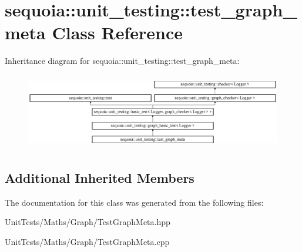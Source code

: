 \hypertarget{classsequoia_1_1unit__testing_1_1test__graph__meta}{}\section{sequoia\+::unit\+\_\+testing\+::test\+\_\+graph\+\_\+meta Class Reference}
\label{classsequoia_1_1unit__testing_1_1test__graph__meta}
Inheritance diagram for sequoia\+::unit\+\_\+testing\+::test\+\_\+graph\+\_\+meta\+:\begin{figure}[H]
\begin{center}
\leavevmode
\includegraphics[height=3.357314cm]{classsequoia_1_1unit__testing_1_1test__graph__meta}
\end{center}
\end{figure}
\subsection*{Additional Inherited Members}


The documentation for this class was generated from the following files\+:\begin{DoxyCompactItemize}
\item 
Unit\+Tests/\+Maths/\+Graph/Test\+Graph\+Meta.\+hpp\item 
Unit\+Tests/\+Maths/\+Graph/Test\+Graph\+Meta.\+cpp\end{DoxyCompactItemize}
